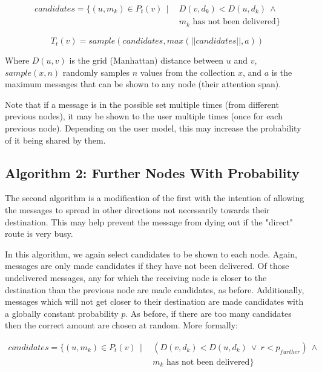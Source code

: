 \documentclass[bsc,frontabs,twoside,singlespacing,parskip,deptreport]{infthesis}     %
\begin{document}
\begin{equation}
\begin{split}
candidates = \{ (u, m_{k}) \in P_{t}(v) \:\: | \:\: & D(v, d_{k}) < D(u, d_{k}) \: \wedge \\
& m_{k} \mbox{ has not been delivered} \}
\end{split}
\end{equation}

\begin{equation}
T_{t}(v) = sample(candidates, max(||candidates||, a))
\end{equation}

Where $D(u, v)$ is the grid (Manhattan) distance between $u$ and $v$, $sample(x, n)$ randomly samples $n$ values from the collection $x$, and $a$ is the maximum messages that can be shown to any node (their attention span).

Note that if a message is in the possible set multiple times (from different previous nodes), it may be shown to the user multiple times (once for each previous node). Depending on the user model, this may increase the probability of it being shared by them.

\subsection{Algorithm 2: Further Nodes With Probability}
The second algorithm is a modification of the first with the intention of allowing the messages to spread in other directions not necessarily towards their destination. This may help prevent the message from dying out if the "direct" route is very busy.

In this algorithm, we again select candidates to be shown to each node. Again, messages are only made candidates if they have not been delivered. Of those undelivered messages, any for which the receiving node is closer to the destination than the previous node are made candidates, as before. Additionally, messages which will not get closer to their destination are made candidates with a globally constant probability $p$. As before, if there are too many candidates then the correct amount are chosen at random. More formally:

\begin{equation}
\begin{split}
candidates = \{ (u, m_{k}) \in P_{t}(v) \:\: | \:\: & (D(v, d_{k}) < D(u, d_{k}) \: \vee \: r < p_{further}) \: \wedge \\
& m_{k} \mbox{ has not been delivered} \}
\end{split}
\end{equation}
\end{document}
